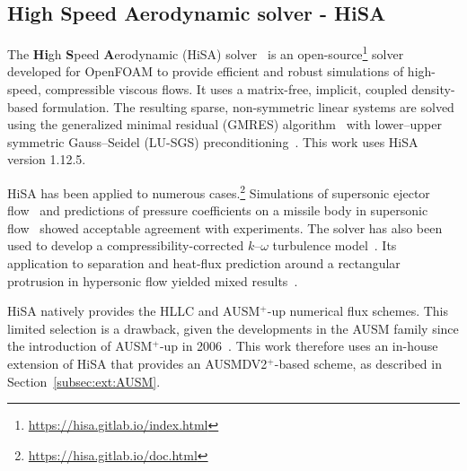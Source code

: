 \subsection{High Speed Aerodynamic solver - HiSA}
\label{subsec:numerical-framework:hisa}

The \textbf{Hi}gh \textbf{S}peed \textbf{A}erodynamic (HiSA) solver~\cite{heyns2014HiSA} is an open-source\footnote{\url{https://hisa.gitlab.io/index.html}} solver developed for OpenFOAM to provide efficient and robust simulations of high-speed, compressible viscous flows. It uses a matrix-free, implicit, coupled density-based formulation. The resulting sparse, non-symmetric linear systems are solved using the generalized minimal residual (GMRES) algorithm~\cite{saad1986gmres} with lower--upper symmetric Gauss--Seidel (LU-SGS) preconditioning~\cite{yoon1988lusgs}. This work uses HiSA version 1.12.5.
\par\medskip

HiSA has been applied to numerous cases.\footnote{\url{https://hisa.gitlab.io/doc.html}} Simulations of supersonic ejector flow~\cite{macia2019ssFlowEjector} and predictions of pressure coefficients on a missile body in supersonic flow~\cite{jun2025ssMissileBody} showed acceptable agreement with experiments. The solver has also been used to develop a compressibility-corrected \(k\)--\(\omega\) turbulence model~\cite{yin2026compressibility}. Its application to separation and heat-flux prediction around a rectangular protrusion in hypersonic flow yielded mixed results~\cite{balkhi2025rectProtrusion}.
\par\medskip

HiSA natively provides the HLLC and AUSM\(^+\)-up numerical flux schemes. This limited selection is a drawback, given the developments in the AUSM family since the introduction of AUSM\(^+\)-up in 2006~\cite{edwards2019AUSMfamily}. This work therefore uses an in-house extension of HiSA that provides an AUSMDV2\(^+\)-based scheme, as described in Section~\ref{subsec:ext:AUSM}.
\par\medskip

